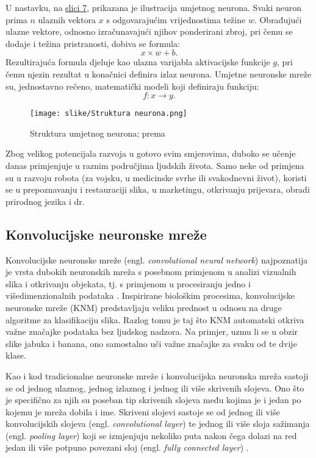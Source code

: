 \documentclass[]{foi} %
\begin{document}
U nastavku, na \hyperref[img: slika 7]{slici 7}, prikazana je ilustracija umjetnog neurona. Svaki neuron prima $n$ ulaznih vektora $x$ s odgovarajućim vrijednostima težine $w$. Obrađujući ulazne vektore, odnosno izračunavajući njihov ponderirani zbroj, pri čemu se dodaje i težina pristranosti, dobiva se formula: \[ x \times w + b. \] Rezultirajuća formula djeluje kao ulazna varijabla aktivacijske funkcije $g$, pri čemu njezin rezultat u konačnici definira izlaz neurona. Umjetne neuronske mreže \cite[str. 59]{AIandGames} su, jednostavno rečeno, matematički modeli koji definiraju funkciju: \[ f : x \rightarrow y.\]

\begin{figure}[H]
    \centering
    \texttt{[image: slike/Struktura neurona.png]}
    \caption{Struktura umjetnog neurona; prema \cite[str. 59]{AIandGames}}
\end{figure}
\label{img: slika 7}

Zbog velikog potencijala razvoja u gotovo svim smjerovima, duboko se učenje danas primjenjuje u raznim područjima ljudskih života. Samo neke od primjena su u razvoju robota (za vojsku, u medicinske svrhe ili svakodnevni život), koristi se u prepoznavanju i restauraciji slika, u marketingu, otkrivanju prijevara, obradi prirodnog jezika i dr. \cite{dubokoRepr}

\subsection{Konvolucijske neuronske mreže}
Konvolucijske neuronske mreže (engl. \textit{convolutional neural network}) najpoznatija je vrsta dubokih neuronskih mreža s posebnom primjenom u analizi vizualnih slika i otkrivanju objekata, tj. s primjenom u procesiranju jedno i višedimenzionalnih podataka \cite{cnn}. Inspirirane biološkim procesima, konvolucijske neuronske mreže (KNM) predstavljaju veliku prednost u odnosu na druge algoritme za klasifikaciju slika. Razlog tomu je taj što KNM automatski otkriva važne značajke podataka bez ljudskog nadzora. Na primjer, uzmu li se u obzir slike jabuka i banana, ono samostalno uči važne značajke za svaku od te dvije klase.

Kao i kod tradicionalne neuronske mreže i konvolucijska neuronska mreža sastoji se od jednog ulaznog, jednog izlaznog i jednog ili više skrivenih slojeva. Ono što je specifično za njih su poseban tip skrivenih slojeva među kojima je i jedan po kojemu je mreža dobila i ime. Skriveni slojevi sastoje se od jednog ili više konvolucijskih slojeva (engl. \textit{convolutional layer}) te jednog ili više sloja sažimanja (engl. \textit{pooling layer}) koji se izmjenjuju nekoliko puta nakon čega dolazi na red jedan ili više potpuno povezani sloj (engl. \textit{fully connected layer}) \cite{cnn}. 
\end{document}
